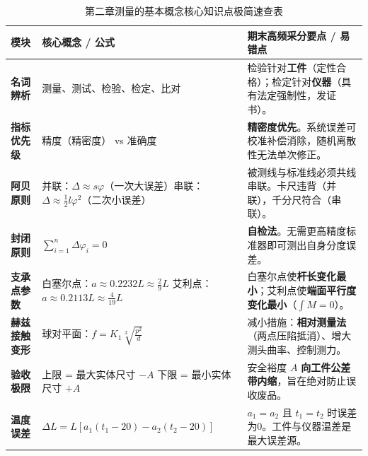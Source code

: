 \documentclass[11pt,a4paper]{ctexart}
\begin{document}
\begin{table}[htbp]
\centering
\small
\caption{第二章测量的基本概念核心知识点极简速查表}
\label{tab:quick_review}
\begin{tabularx}{\textwidth}{p{2.8cm} p{4.2cm} X}
\toprule
\textbf{模块} & \textbf{核心概念 / 公式} & \textbf{期末高频采分要点 / 易错点} \\
\midrule
\textbf{名词辨析} & 测量、测试、检验、检定、比对 & 检验针对\textbf{工件}（定性合格）；检定针对\textbf{仪器}（具有法定强制性，发证书）。 \\
\midrule
\textbf{指标优先级} & 精度（精密度） vs 准确度 & \textbf{精密度优先}。系统误差可校准补偿消除，随机离散性无法单次修正。 \\
\midrule
\textbf{阿贝原则} & 并联：$\Delta \approx s\varphi$（一次大误差）\newline 串联：$\Delta \approx \frac{1}{2}l\varphi^2$（二次小误差） & 被测线与标准线必须共线串联。卡尺违背（并联），千分尺符合（串联）。 \\
\midrule
\textbf{封闭原则} & $\sum_{i=1}^n \Delta\varphi_i = 0$ & \textbf{自检法}。无需更高精度标准器即可测出自身分度误差。 \\
\midrule
\textbf{支承点参数} & 白塞尔点：$a \approx 0.2232L \approx \frac{2}{9}L$ \newline 艾利点：$a \approx 0.2113L \approx \frac{4}{19}L$ & 白塞尔点使\textbf{杆长变化最小}；艾利点使\textbf{端面平行度变化最小}（$\int M = 0$）。 \\
\midrule
\textbf{赫兹接触变形} & 球对平面：$f = K_1 \sqrt[3]{\frac{p^2}{d}}$ & 减小措施：\textbf{相对测量法}（两点压陷抵消）、增大测头曲率、控制测力。 \\
\midrule
\textbf{验收极限} & 上限 = 最大实体尺寸 $- A$ \newline 下限 = 最小实体尺寸 $+ A$ & 安全裕度 $A$ \textbf{向工件公差带内缩}，旨在绝对防止误收废品。 \\
\midrule
\textbf{温度误差} & $\Delta L = L [a_1(t_1-20) - a_2(t_2-20)]$ & $a_1=a_2$ 且 $t_1=t_2$ 时误差为0。工件与仪器温差是最大误差源。 \\
\bottomrule
\end{tabularx}
\end{table}
\end{document}
